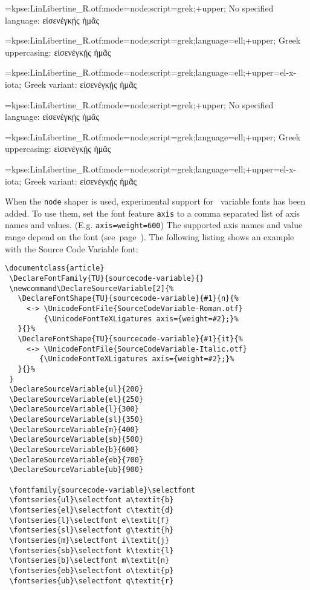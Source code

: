    \beginlisting
   \font\test={kpse:LinLibertine_R.otf:mode=node;script=grek;+upper;}
   No specified language: {\test εἰσενέγκῄς ἡμᾶς}\par
   \font\test={kpse:LinLibertine_R.otf:mode=node;script=grek;language=ell;+upper;}
   Greek uppercasing: {\test εἰσενέγκῄς ἡμᾶς}\par
   \font\test={kpse:LinLibertine_R.otf:mode=node;script=grek;language=ell;+upper=el-x-iota;}
   Greek variant: {\test εἰσενέγκῄς ἡμᾶς}\par
   \endlisting

   {%
     \font\test={kpse:LinLibertine\string_R.otf:mode=node;script=grek;+upper;}
     No specified language: {\test εἰσενέγκῄς ἡμᾶς}\par
     \font\test={kpse:LinLibertine\string_R.otf:mode=node;script=grek;language=ell;+upper;}
     Greek uppercasing: {\test εἰσενέγκῄς ἡμᾶς}\par
     \font\test={kpse:LinLibertine\string_R.otf:mode=node;script=grek;language=ell;+upper=el-x-iota;}
     Greek variant: {\test εἰσενέγκῄς ἡμᾶς}\par
   }


  \endaltitem

   When\label{variablefonts}
   the \texttt{node} shaper is used,
   experimental support for \OpenType\ variable
   fonts has been added. To use them, set the font feature \texttt{axis} to
   a comma separated list of axis names and values. (E.g.  \texttt{axis={weight=600}})
   The supported axis names and value range depend on the font (see~page~\pageref{variablefonts}).
   The following listing shows an example with the Source Code Variable font:

  \begin{lstlisting}[columns=fullflexible]
\documentclass{article}
 \DeclareFontFamily{TU}{sourcecode-variable}{}
 \newcommand\DeclareSourceVariable[2]{%
   \DeclareFontShape{TU}{sourcecode-variable}{#1}{n}{%
     <-> \UnicodeFontFile{SourceCodeVariable-Roman.otf}
         {\UnicodeFontTeXLigatures axis={weight=#2};}%
   }{}%
   \DeclareFontShape{TU}{sourcecode-variable}{#1}{it}{%
     <-> \UnicodeFontFile{SourceCodeVariable-Italic.otf}
        {\UnicodeFontTeXLigatures axis={weight=#2};}%
   }{}%
 }
 \DeclareSourceVariable{ul}{200}
 \DeclareSourceVariable{el}{250}
 \DeclareSourceVariable{l}{300}
 \DeclareSourceVariable{sl}{350}
 \DeclareSourceVariable{m}{400}
 \DeclareSourceVariable{sb}{500}
 \DeclareSourceVariable{b}{600}
 \DeclareSourceVariable{eb}{700}
 \DeclareSourceVariable{ub}{900}
 
 \fontfamily{sourcecode-variable}\selectfont
 \fontseries{ul}\selectfont a\textit{b}
 \fontseries{el}\selectfont c\textit{d}
 \fontseries{l}\selectfont e\textit{f}
 \fontseries{sl}\selectfont g\textit{h}
 \fontseries{m}\selectfont i\textit{j}
 \fontseries{sb}\selectfont k\textit{l}
 \fontseries{b}\selectfont m\textit{n}
 \fontseries{eb}\selectfont o\textit{p}
 \fontseries{ub}\selectfont q\textit{r}
 
\end{lstlisting}

